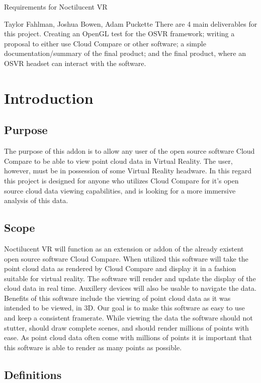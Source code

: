 \documentclass[titlepage]{article}
\begin{document}
\begin{titlepage}
\centering
{\Huge Requirements for Noctilucent VR\par}
{\Large Taylor Fahlman, Joshua Bowen, Adam Puckette}
\abstract
There are 4 main deliverables for this project. Creating an OpenGL test for the OSVR framework;
writing a proposal to either use Cloud Compare or other software; a simple documentation/summary of
the final product; and the final product, where an OSVR headset can interact with the software.
\end{titlepage}

\section{Introduction}
\subsection{Purpose}

The purpose of this addon is to allow any user of the open source software Cloud Compare to be able to view point cloud data in Virtual Reality.
The user, however, must be in possession of some Virtual Reality headware. 
In this regard this project is designed for anyone who utilizes Cloud Compare for it's open source cloud data viewing capabilities,
and is looking for a more immersive analysis of this data.

\subsection{Scope}

Noctilucent VR will function as an extension or addon of the already existent open source software Cloud Compare.
When utilized this software will take the point cloud data as rendered by Cloud Compare and display it in a fashion suitable for virtual reality.
The software will render and update the display of the cloud data in real time.
Auxillery devices will also be usable to navigate the data.
Benefits of this software include the viewing of point cloud data as it was intended to be viewed, in 3D.
Our goal is to make this software as easy to use and keep a consistent framerate.
While viewing the data the software should not stutter,
should draw complete scenes,
and should render millions of points with ease.
As point cloud data often come with millions of points it is important that this software is able to render as many points as possible.

\subsection{Definitions}
\end{document}
